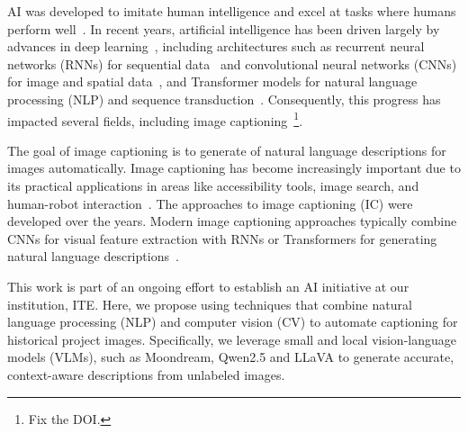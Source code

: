 \documentclass[runningheads]{llncs}
\begin{document}
AI was developed to imitate human intelligence and excel at tasks where humans perform well~\cite{McCarthy1955Proposal,russell2021ai,olteanu2025ai}. 
In recent years, artificial intelligence has been driven largely by advances in deep learning~\cite{LeCun2015DeepLearning,Schmidhuber2015DeepLearningOverview}, including architectures such as recurrent neural networks (RNNs) for sequential data~\cite{Lipton2015RNNReview} and convolutional neural networks (CNNs) for image and spatial data~\cite{Khan2019CNNArchitecturesSurvey}, and Transformer models for natural language processing (NLP) and sequence transduction~\cite{Vaswani2017Attention}. Consequently, this progress has impacted several fields, including image captioning~\cite{Hossain2019ImageCaptioningSurvey}\footnote{Fix the DOI.}.

The goal of image captioning is to generate of natural language descriptions for images automatically. Image captioning has become increasingly important due to its practical applications in areas like accessibility tools, image search, and human-robot interaction~\cite{Danish2026VLMsurvey}. The approaches to image captioning (IC) were developed over the years. Modern image captioning approaches typically combine CNNs for visual feature extraction with RNNs or Transformers for generating natural language descriptions~\cite{Cahyono2024AutomatedImageCaptioning}.


This work is part of an ongoing effort to establish an AI initiative at our institution, ITE. Here, we propose using techniques that combine natural language processing (NLP) and computer vision (CV) to automate captioning for historical project images. Specifically, we leverage small and local vision-language models (VLMs), such as Moondream, Qwen2.5 and LLaVA to generate accurate, context-aware descriptions from unlabeled images.
\end{document}
